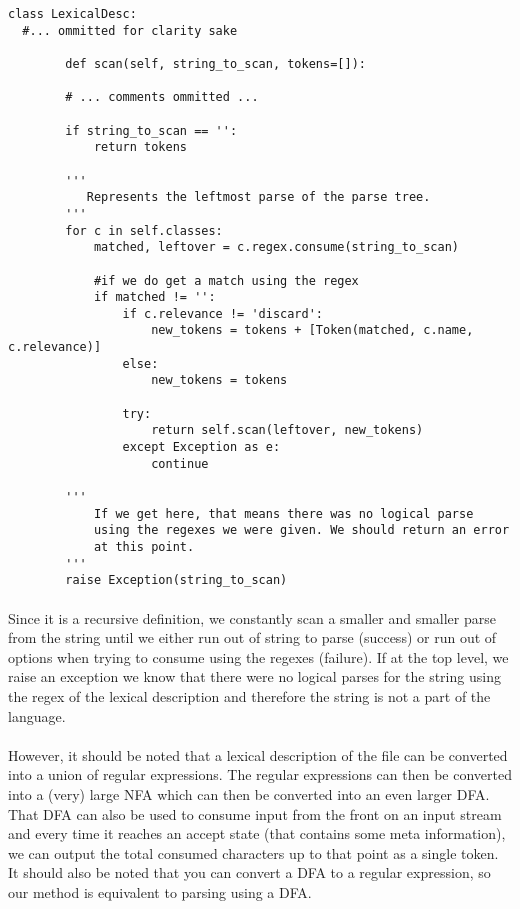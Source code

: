 \documentclass{article}
\begin{document}
\begin{verbatim}
class LexicalDesc:
  #... ommitted for clarity sake

        def scan(self, string_to_scan, tokens=[]):

        # ... comments ommitted ...

        if string_to_scan == '':
            return tokens

        '''
           Represents the leftmost parse of the parse tree.
        '''
        for c in self.classes:
            matched, leftover = c.regex.consume(string_to_scan)

            #if we do get a match using the regex
            if matched != '':
                if c.relevance != 'discard':
                    new_tokens = tokens + [Token(matched, c.name, c.relevance)]
                else:
                    new_tokens = tokens

                try:
                    return self.scan(leftover, new_tokens)
                except Exception as e:
                    continue

        ''' 
            If we get here, that means there was no logical parse
            using the regexes we were given. We should return an error
            at this point. 
        '''
        raise Exception(string_to_scan)
\end{verbatim}

\paragraph{} Since it is a recursive definition, we constantly scan a
smaller and smaller parse from the string until we either run out of
string to parse (success) or run out of options when trying to consume
using the regexes (failure). If at the top level, we raise an
exception we know that there were no logical parses for the string
using the regex of the lexical description and therefore the string is
not a part of the language.


\paragraph{} However, it should be noted that a lexical description
of the file can be converted into a union of regular expressions. The
regular expressions can then be converted into a (very) large NFA
which can then be converted into an even larger DFA. That DFA can also
be used to consume input from the front on an input stream and every
time it reaches an accept state (that contains some meta information),
we can output the total consumed characters up to that point as a
single token.  It should also be noted that you can convert a DFA to a
regular expression, so our method is equivalent to parsing using a
DFA.
\end{document}
